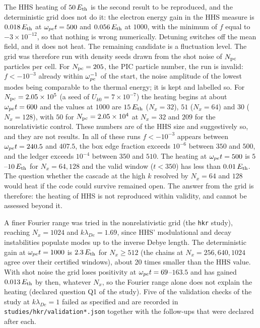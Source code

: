 The HHS heating of $50\,E_{\rm th}$ is the second result to be reproduced, and the deterministic grid does not do it: the electron energy gain in the HHS measure is $0.018\,E_{\rm th}$ at $\omega_{pe} t=500$ and $0.056\,E_{\rm th}$ at $1000$, with the minimum of $f$ equal to $-3\times10^{-12}$, so that nothing is wrong numerically. Detuning switches off the mean field, and it does not heat. The remaining candidate is a fluctuation level. The grid was therefore run with density seeds drawn from the shot noise of $N_{\rm pc}$ particles per cell. For $N_{\rm pc}=205$, the PIC particle number, the run is invalid: $f<-10^{-3}$ already within $\omega_{pe}^{-1}$ of the start, the noise amplitude of the lowest modes being comparable to the thermal energy; it is kept and labelled so. For $N_{\rm pc}=2.05\times10^{5}$ (a seed of $U_{k0}=7\times10^{-7}$) the heating begins at about $\omega_{pe} t=600$ and the values at $1000$ are $15\,E_{\rm th}$ ($N_x=32$), $51$ ($N_x=64$) and $30$ ($N_x=128$), with $50$ for $N_{\rm pc}=2.05\times10^{4}$ at $N_x=32$ and $209$ for the nonrelativistic control. These numbers are of the HHS size and suggestively so, and they are not results. In all of these runs $f<-10^{-3}$ appears between $\omega_{pe} t=240.5$ and $407.5$, the box edge fraction exceeds $10^{-6}$ between $350$ and $500$, and the ledger exceeds $10^{-4}$ between $350$ and $510$. The heating at $\omega_{pe} t=500$ is $5$--$10\,E_{\rm th}$ for $N_x=64,128$ and the valid window ($t<350$) has less than $0.01\,E_{\rm th}$. The question whether the cascade at the high $k$ resolved by $N_x=64$ and $128$ would heat if the code could survive remained open. The answer from the grid is therefore: the heating of HHS is not reproduced within validity, and cannot be assessed beyond it.

A finer Fourier range was tried in the nonrelativistic grid (the \texttt{hkr} study), reaching $N_x=1024$ and $k\lambda_{De}=1.69$, since HHS' modulational and decay instabilities populate modes up to the inverse Debye length. The deterministic gain at $\omega_{pe} t=1000$ is $2.3\,E_{\rm th}$ for $N_x\ge512$ (the chains at $N_x=256,640,1024$ agree over their certified windows), about 20 times smaller than the HHS value. With shot noise the grid loses positivity at $\omega_{pe} t=69$--$163.5$ and has gained $0.013\,E_{\rm th}$ by then, whatever $N_x$, so the Fourier range alone does not explain the heating (declared question Q1 of the study). Five of the validation checks of the study at $k\lambda_{De}=1$ failed as specified and are recorded in \texttt{studies/hkr/validation*.json} together with the follow-ups that were declared after each.

